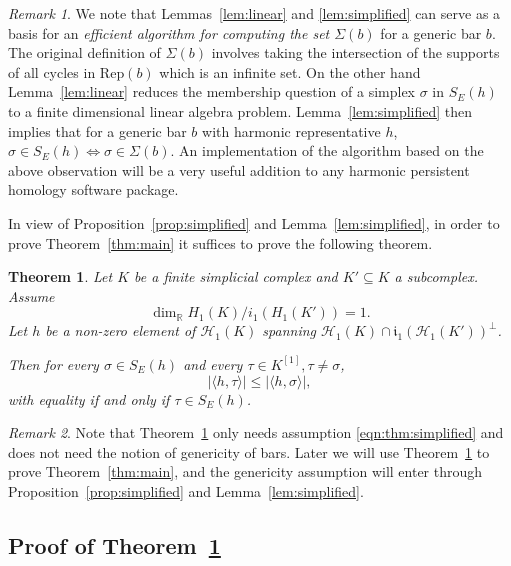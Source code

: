 \documentclass[11pt]{amsart}
\theoremstyle{theorem}
\newtheorem{theorem}{Theorem}
\theoremstyle{remark}
\newtheorem{remark}{Remark}[section]
\theoremstyle{definition}
\newcommand{\hide}[1]{}
\newcommand{\Rep}{\mathrm{Rep}}
\begin{document}
\begin{remark}
\label{rem:efficiency}
    We note that Lemmas~\ref{lem:linear} and \ref{lem:simplified} can serve as a basis for an \emph{efficient algorithm for computing the set $\Sigma(b)$} for a generic bar $b$. The original definition of $\Sigma(b)$ involves taking the intersection of the supports of all cycles in $\Rep(b)$ which is an infinite set. On the other hand Lemma~\ref{lem:linear} reduces the membership question of a simplex $\sigma$ in $S_E(h)$ to a finite dimensional linear algebra problem. Lemma~\ref{lem:simplified} then implies that for a generic bar $b$ with
     harmonic representative $h$, $\sigma \in S_E(h) \Leftrightarrow \sigma \in \Sigma(b)$. An implementation of the algorithm based on the above observation will be a very useful addition to any harmonic persistent homology software package. 
\end{remark}


In view of Proposition~\ref{prop:simplified} and Lemma~\ref{lem:simplified}, in order to prove Theorem~\ref{thm:main} it suffices to prove the following theorem.


\begin{theorem}
\label{thm:simplified}
Let \(K\) be a finite simplicial complex and \(K'\subseteq K\) a subcomplex.
Assume
\begin{equation}
\label{eqn:thm:simplified}
\dim_{\mathbb R} H_1(K)/i_1(H_1(K'))=1.
\end{equation}
Let $h$ be a non-zero element of \(\mathcal H_1(K)\) spanning
\(\mathcal H_1(K)\cap \mathfrak{i}_1(\mathcal H_1(K'))^\perp\).
\hide{
Then for every \(\sigma\in S_E(h)\) and every \(\tau\in S_N(h)\),
\[
|\langle h,\tau\rangle|<|\langle h,\sigma\rangle|.
\]
}
Then for every \(\sigma\in S_E(h)\) and every \(\tau\in K^{[1]}, \tau \neq \sigma\),
\[
|\langle h,\tau\rangle| \leq |\langle h,\sigma\rangle|,
\]
with equality if and only if $\tau \in S_E(h)$.
\end{theorem}

\begin{remark}
    Note that Theorem~\ref{thm:simplified} only needs assumption \eqref{eqn:thm:simplified} and does not need the notion of genericity of bars. Later we will use Theorem~\ref{thm:simplified} to prove Theorem~\ref{thm:main}, and the genericity assumption will enter through Proposition~\ref{prop:simplified} and Lemma~\ref{lem:simplified}.
\end{remark}

\subsection{Proof of Theorem~\ref{thm:simplified}}
\label{subsec:simplified}
\end{document}

